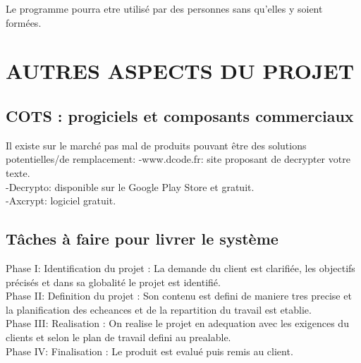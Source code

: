 \documentclass[a4]{article}
\begin{document}
				Le programme pourra etre utilisé par des personnes sans qu'elles y soient formées.
		\section{AUTRES ASPECTS DU PROJET}
		\subsection{COTS : progiciels et composants commerciaux}
		Il existe sur le marché pas mal de produits pouvant être des solutions potentielles/de remplacement:
		-www.dcode.fr: site proposant de decrypter votre texte. \\
		-Decrypto: disponible sur le Google Play Store et gratuit.\\
		-Axcrypt: logiciel gratuit.
		\subsection{Tâches à faire pour livrer le système}
		Phase I: Identification du projet : La demande du client est clarifiée, les objectifs précisés et dans sa globalité le projet est identifié.\\
		Phase II: Definition du projet : Son contenu est defini de maniere tres precise et la planification des echeances et de la repartition du travail est etablie.\\
		Phase III: Realisation : On realise le projet en adequation avec les exigences du clients et selon le plan de travail defini au prealable.\\
		Phase IV: Finalisation : Le produit est evalué puis remis au client.
		
\end{document}
